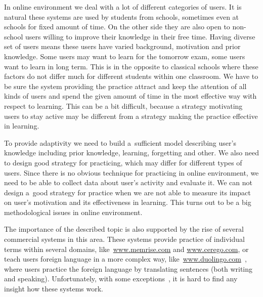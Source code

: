 \documentclass[table,color,cover,twoside,nolot,nolof]{fithesis3/fithesis3}
\begin{document}
In online environment we deal with a lot of different categories of users. It
is natural these systems are used by students from schools, sometimes even at
schools for fixed amount of time. On the other side they are also open to
non-school users willing to improve their knowledge in their free time. Having
diverse set of users means these users have varied background, motivation and
prior knowledge.  Some users may want to learn for the tomorrow exam, some
users want to learn in long term. This is in the opposite to classical schools
where these factors do not differ much for different students within one
classroom. We have to be sure the system providing the practice attract and
keep the attention of all kinds of users and spend the given amount of time in
the most effective way with respect to learning.  This can be a bit difficult,
because a strategy motivating users to stay active may be different from a
strategy making the practice effective in learning.

To provide adaptivity we need to build a~sufficient model describing user's
knowledge including prior knowledge, learning, forgetting and other. We also
need to design good strategy for practicing, which may differ for different
types of users. Since there is no obvious technique for practicing in online
environment, we need to be able to collect data about user's activity and
evaluate it. We can not design a~good strategy for practice when we are not
able to measure its impact on user's motivation and its effectiveness in
learning. This turns out to be a big methodological issues in online
environment.

The importance of the described topic is also supported by the rise of several
commercial systems in this area. These systems provide practice of individual
terms within several domains, like~\url{www.memrise.com} and
\url{www.cerego.com}, or teach users foreign language in a more complex way,
like~\url{www.duolingo.com}~\cite{garcia2013learning}, where users practice the
foreign language by translating sentences (both writing and speaking).
Unfortunately, with some exceptions~\cite{streeter2015mixture}, it is hard to
find any insight how these systems work.
\end{document}
